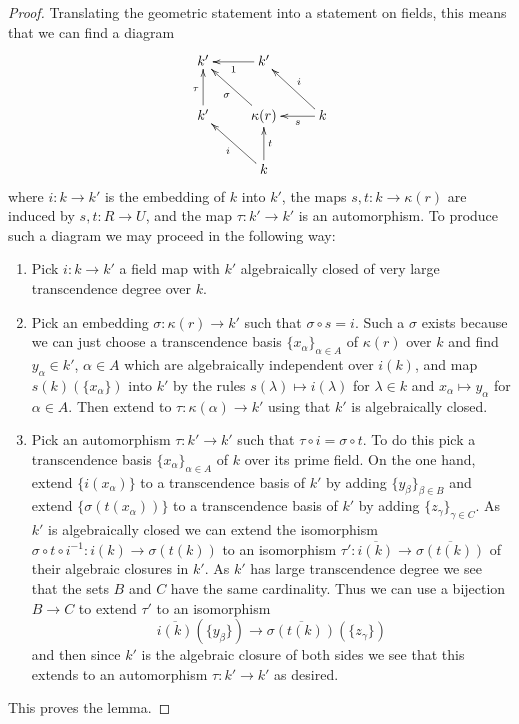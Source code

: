 \documentclass{stacks-project}
\theoremstyle{plain}
\theoremstyle{definition}
\theoremstyle{remark}
\numberwithin{equation}{subsection}
\begin{document}
\begin{proof}
Translating the geometric statement into a statement on fields,
this means that we can find a diagram
$$
\xymatrix{
k' & k' \ar[l]^1 & \\
k' \ar[u]^\tau & \kappa(r) \ar[lu]^\sigma & k \ar[l]^-s \ar[lu]_i \\
& k \ar[lu]^i \ar[u]_t
}
$$
where $i : k \to k'$ is the embedding of $k$ into $k'$,
the maps $s, t : k \to \kappa(r)$ are induced by $s, t : R \to U$, and
the map $\tau : k' \to k'$ is an automorphism. To produce such
a diagram we may proceed in the following way:
\begin{enumerate}
\item Pick $i : k \to k'$ a field map with $k'$ algebraically closed of
very large transcendence degree over $k$.
\item Pick an embedding $\sigma : \kappa(r) \to k'$ such that
$\sigma \circ s = i$. Such a $\sigma$ exists because we can just
choose a transcendence basis $\{x_\alpha\}_{\alpha \in A}$ of $\kappa(r)$
over $k$ and find $y_\alpha \in k'$, $\alpha \in A$ which are algebraically
independent over $i(k)$, and map $s(k)(\{x_\alpha\})$ into $k'$ by
the rules $s(\lambda) \mapsto i(\lambda)$ for $\lambda \in k$
and $x_\alpha \mapsto y_\alpha$ for $\alpha \in A$.
Then extend to $\tau : \kappa(\alpha) \to k'$ using that $k'$ is
algebraically closed.
\item Pick an automorphism $\tau : k' \to k'$ such that
$\tau \circ i = \sigma \circ t$. To do this pick a transcendence
basis $\{x_\alpha\}_{\alpha \in A}$ of $k$ over its prime field.
On the one hand, extend $\{i(x_\alpha)\}$ to a transcendence basis of
$k'$ by adding $\{y_\beta\}_{\beta \in B}$ and extend
$\{\sigma(t(x_\alpha))\}$ to a transcendence basis of $k'$ by adding
$\{z_\gamma\}_{\gamma \in C}$.
As $k'$ is algebraically closed we can extend the isomorphism
$\sigma \circ t \circ i^{-1} : i(k) \to \sigma(t(k))$
to an isomorphism $\tau' : \overline{i(k)} \to \overline{\sigma(t(k))}$
of their algebraic closures in $k'$.
As $k'$ has large transcendence degree
we see that the sets $B$ and $C$ have the same cardinality.
Thus we can use a bijection
$B \to C$ to extend $\tau'$ to an isomorphism
$$
\overline{i(k)}(\{y_\beta\})
\longrightarrow
\overline{\sigma(t(k))}(\{z_\gamma\})
$$
and then since $k'$ is the algebraic closure of both sides we
see that this extends to an automorphism $\tau : k' \to k'$
as desired.
\end{enumerate}
This proves the lemma.
\end{proof}
\end{document}

